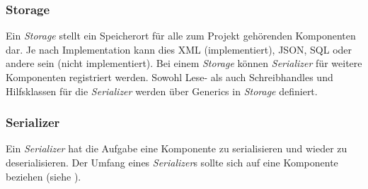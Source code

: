 \subsubsection{Storage}
Ein \textit{Storage} stellt ein Speicherort für alle zum Projekt gehörenden Komponenten dar. Je nach
Implementation kann dies XML (implementiert), JSON, SQL oder andere sein (nicht implementiert). Bei einem
\textit{Storage} können \textit{Serializer} für weitere Komponenten registriert werden. Sowohl Lese- als
auch Schreibhandles und Hilfsklassen für die \textit{Serializer} werden über Generics in \textit{Storage}
definiert.

\subsubsection{Serializer}
Ein \textit{Serializer} hat die Aufgabe eine Komponente zu serialisieren und wieder zu deserialisieren.
Der Umfang eines \textit{Serializer}s sollte sich auf eine Komponente beziehen (siehe ).